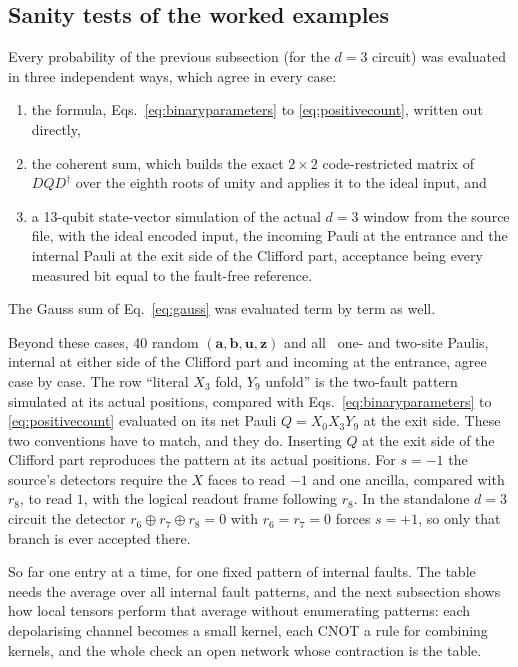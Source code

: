 \subsection{Sanity tests of the worked examples}\label{app:B-checks}

Every probability of the previous subsection (for the $d=3$ circuit) was evaluated in three independent ways, which agree in every case:
\begin{enumerate}
\item the formula, Eqs.~\eqref{eq:binaryparameters} to \eqref{eq:positivecount}, written out directly,
\item the coherent sum, which builds the exact $2\times2$ code-restricted matrix of $DQD^\dagger$ over the eighth roots of unity and applies it to the ideal input, and
\item a 13-qubit state-vector simulation of the actual $d=3$ window from the source file, with the ideal encoded input, the incoming Pauli at the entrance and the internal Pauli at the exit side of the Clifford part, acceptance being every measured bit equal to the fault-free reference.
\end{enumerate}
The Gauss sum of Eq.~\eqref{eq:gauss} was evaluated term by term as well.
\begin{center}\end{center}
Beyond these cases, 40 random $(\boldsymbol a,\boldsymbol b,\boldsymbol u,\boldsymbol z)$ and all \scancases\ one- and two-site Paulis, internal at either side of the Clifford part and incoming at the entrance, agree case by case. 
The row ``literal $X_3$ fold, $Y_9$ unfold'' is the two-fault pattern simulated at its actual positions, compared with Eqs.~\eqref{eq:binaryparameters} to \eqref{eq:positivecount} evaluated on its net Pauli $Q=X_0X_3Y_9$ at the exit side.
These two conventions have to match, and they do. 
Inserting $Q$ at the exit side of the Clifford part reproduces the pattern at its actual positions. For $s=-1$ the source's detectors require the $X$ faces to read $-1$ and one ancilla, compared with $r_8$, to read $1$, with the logical readout frame following $r_8$. 
In the standalone $d=3$ circuit the detector $r_6\oplus r_7\oplus r_8=0$ with $r_6=r_7=0$ forces $s=+1$, so only that branch is ever accepted there.

So far one entry at a time, for one fixed pattern of internal faults. The table needs the average over all internal fault patterns, and the next subsection shows how local tensors perform that average without enumerating patterns: each depolarising channel becomes a small kernel, each CNOT a rule for combining kernels, and the whole check an open network whose contraction is the table.

